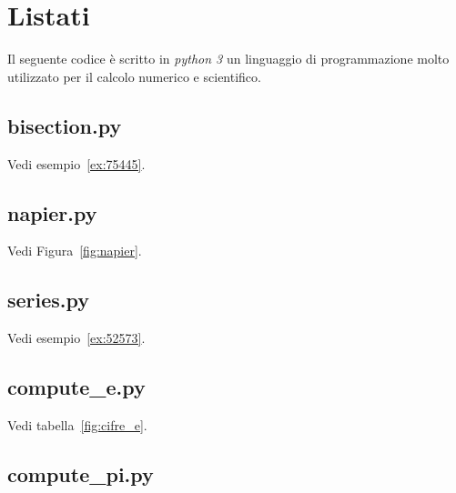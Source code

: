 \chapter{Listati}

Il seguente codice è scritto in \emph{python 3}%
un linguaggio di programmazione
molto utilizzato per il calcolo numerico e scientifico.


\section{bisection.py}

Vedi esempio~\ref{ex:75445}.
\label{code:bisection}


\section{napier.py}

Vedi Figura~\ref{fig:napier}.
\label{code:napier}


\section{series.py}

Vedi esempio~\ref{ex:52573}.
\label{code:series}


\section{compute\_e.py}

Vedi tabella~\ref{fig:cifre_e}.
\label{code:compute_e}


\section{compute\_pi.py}


